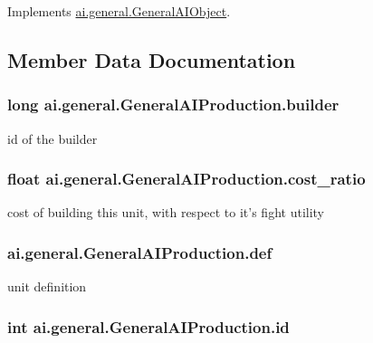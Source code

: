 Implements \hyperlink{classai_1_1general_1_1_general_a_i_object_adcb52382eaf3447f61640f6aca6225f6}{ai.general.GeneralAIObject}.



\subsection{Member Data Documentation}
\hypertarget{classai_1_1general_1_1_general_a_i_production_ad61bcf26860fa5d16c9bd0d7584d7a76}{
\subsubsection[{builder}]{\setlength{\rightskip}{0pt plus 5cm}long {\bf ai.general.GeneralAIProduction.builder}}}
\label{classai_1_1general_1_1_general_a_i_production_ad61bcf26860fa5d16c9bd0d7584d7a76}
id of the builder \hypertarget{classai_1_1general_1_1_general_a_i_production_acfb00da6fdc3b54f03286bb570639457}{
\subsubsection[{cost\_\-ratio}]{\setlength{\rightskip}{0pt plus 5cm}float {\bf ai.general.GeneralAIProduction.cost\_\-ratio}}}
\label{classai_1_1general_1_1_general_a_i_production_acfb00da6fdc3b54f03286bb570639457}
cost of building this unit, with respect to it's fight utility \hypertarget{classai_1_1general_1_1_general_a_i_production_a1dba4dcb9529b0ec1fbdd5877fc9e80e}{
\subsubsection[{def}]{ {\bf ai.general.GeneralAIProduction.def}}}
\label{classai_1_1general_1_1_general_a_i_production_a1dba4dcb9529b0ec1fbdd5877fc9e80e}
unit definition \hypertarget{classai_1_1general_1_1_general_a_i_production_af587890ea032afe2018b3703eba0d644}{
\subsubsection[{id}]{\setlength{\rightskip}{0pt plus 5cm}int {\bf ai.general.GeneralAIProduction.id}}}
